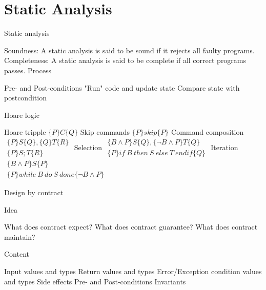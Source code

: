 \section{Static Analysis}
\begin{itemize}
\bulletitem Static analysis
\begin{itemize}
\bulletitem Soundness: A static analysis is said to be sound if it rejects all faulty programs.
\bulletitem Completeness: A static analysis is said to be complete if all correct programs passes.
\bulletitem Process
\begin{itemize}
\bulletitem Pre- and Post-conditions
\bulletitem "Run" code and update state
\bulletitem Compare state with postcondition
\end{itemize}
\end{itemize}
\bulletitem Hoare logic
\begin{itemize}
\bulletitem Hoare tripple \( \{ P \} C \{ Q \} \)
\bulletitem Skip commands \( \{ P \} skip \{ P \} \)
\bulletitem Command composition \( \begin{matrix} \{ P \} S \{ Q \}, \{ Q \} T \{ R \}\\ \{ P \} S;T \{ R \} \end{matrix} \)
\bulletitem Selection \( \begin{matrix} \{ B \land P \} S \{ Q \}, \{ \neg B \land P \} T \{ Q \}\\ \{ P \} if \: B \: then \: S \: else \: T \: endif \{ Q \} \end{matrix} \)
\bulletitem Iteration \( \begin{matrix} \{ B \land P \} S \{ P \}\\ \{ P \} while \: B \: do \: S \: done \{ \neg B \land P \} \end{matrix} \)
\end{itemize}
\bulletitem Design by contract
\begin{itemize}
\bulletitem Idea
\begin{itemize}
\bulletitem What does contract expect?
\bulletitem What does contract guarantee?
\bulletitem What does contract maintain?
\end{itemize}
\bulletitem Content
\begin{itemize}
\bulletitem Input values and types
\bulletitem Return values and types
\bulletitem Error/Exception condition values and types
\bulletitem Side effects
\bulletitem Pre- and Post-conditions
\bulletitem Invariants
\end{itemize}
\end{itemize}
\end{itemize}